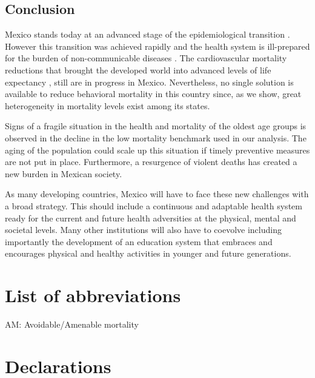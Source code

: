 \documentclass{bmcart}
\begin{document}
	

\subsection*{Conclusion}
Mexico stands today at an advanced stage of the epidemiological transition \cite{gomez2016dissonant}. However this transition was achieved rapidly and the health system is ill-prepared for the burden of non-communicable diseases \cite{rivera2002epidemiological}. The cardiovascular mortality reductions that brought the developed world into advanced levels of life expectancy \cite{leon2011trends}, still are in progress in Mexico. Nevertheless, no single solution is available to reduce behavioral mortality in this country since, as we show, great heterogeneity in mortality levels exist among its states. 

Signs of a fragile situation in the health and mortality of the oldest age groups is observed in the decline in the low mortality benchmark used in our analysis. The aging of the population could scale up this situation if timely preventive measures are not put in place. Furthermore, a resurgence of violent deaths \cite{gamlin2015violence,Aburto2015} has created a new burden in Mexican society. 

As many developing countries, Mexico will have to face these new challenges with a broad strategy. This should include a continuous and adaptable health system ready for the current and future health adversities at the physical, mental and societal levels. Many other institutions will also have to coevolve including importantly the development of an education system that embraces and encourages physical and healthy activities in younger and future generations.

\section*{List of abbreviations}
AM: Avoidable/Amenable mortality

\section*{Declarations}

\end{document}
